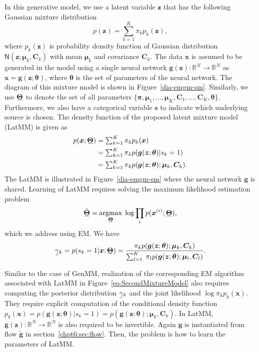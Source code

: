 In this generative model, we use a latent variable $\bm{z}$ that has the following Gaussian mixture distribution
\begin{equation}
  p(\bm{z}) = \sum_{k=1}^K \pi_k p_k(\bm{z}), %
\end{equation}
where $p_k(\bm{z})$ is probability density function of Gaussian distribution $\mathsf{N}(\bm{z};\bm{\mu}_k,\bm{C}_k)$ with mean $\bm{\mu}_k$ and covariance $\bm{C}_k$.
The data $\bm{x}$ is
assumed to be generated in the model using a single neural network
$\bm{g}(\bm{z}): \mathbb{R}^N \rightarrow \mathbb{R}^N$ as
$\bm{x}=\bm{g}(\bm{z};\bm{\theta})$, where $\bm{\theta}$
is the set of parameters of the neural network. The diagram of this mixture model
is shown in Figure~\ref{dia-emgm-sm}. Similarly, we use $\ubar{\bm{\Theta}}$ to denote the set of all parameters $\{ \bm{\pi},
\bm{\mu}_1,\hdots, \bm{\mu}_K, \bm{C}_1,\hdots,
\bm{C}_K, \bm{\theta} \}$. Furthermore, we also have a categorical variable $\bm{s}$ to indicate which underlying source is chosen. The density function of the proposed latent mixture model (LatMM) is given as
\begin{align}\label{eq:SecondMixtureModel}
  p(\bm{x};\ubar{\bm{\Theta}}) & = \textstyle\sum_{k=1}^K \pi_k p_k(\bm{x}) \nonumber\\
                               &= \textstyle\sum_{k=1}^K \pi_k  p(\bm{g}(\bm{z}; \bm{\theta})| s_k=1) \nonumber \\
                               & = \textstyle\sum_{k=1}^K \pi_k  p(\bm{g}(\bm{z};\bm{\theta}); \bm{\mu}_k, \bm{C}_k).
\end{align}
The LatMM is illustrated in Figure~\ref{dia-emgm-sm} where the neural network $\bm{g}$ is shared. Learning of LatMM requires solving the maximum likelihood estimation problem
\begin{equation}
  \ubar{\hat{\bm{\Theta}}} =    \uargmax{\ubar{\bm{\Theta}}}{} \log \prod_{i} p(\bm{x}^{(i)};\ubar{\bm{\Theta}}),
\end{equation}
which we address using EM.
We have
\begin{align}\label{eq-latMM-gamma}
  \ubar{\gamma}_k = p(s_k =1|\bm{x};\ubar{\bm{\Theta}})  
  = \frac{\pi_k p(\bm{g}(\bm{z};\bm{\theta});\bm{\mu}_k, \bm{C}_k)}{\sum_{l=1}^K\; \pi_l p(\bm{g}(\bm{z};\bm{\theta});\bm{\mu}_l, \bm{C}_l)}.
\end{align}

Similar to the case of GenMM, realization of the corresponding EM
algorithm associated with LatMM in Figure~\ref{eq:SecondMixtureModel}
also requires computing the posterior distribution $\ubar{\gamma}_k$ and the joint likelihood $\log{\pi_k p_k(\bm{x})}$. They require explicit computation of the conditional density function $p_k(\bm{x}) = p(\bm{g}(\bm{z};\bm{\theta})| s_k=1) = p(\bm{g}(\bm{z};\bm{\theta});\bm{\mu}_k, \bm{C}_k) $. In LatMM, $\bm{g}(\bm{z}): \mathbb{R}^N \rightarrow \mathbb{R}^N$ is also required to be invertible. Again $\bm{g}$ is instantiated from flow $\tilde{\bm{g}}$ in section~\ref{chpt6:sec:flow}. Then, the problem is how to learn the parameters of LatMM.

